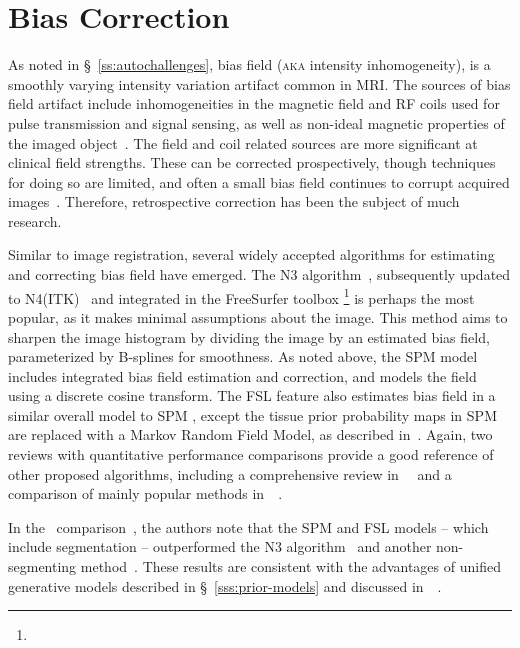 \section{Bias Correction}\label{s:pre-bias}
As noted in \S~\ref{ss:autochallenges}, bias field (\textsc{aka} intensity inhomogeneity),
is a smoothly varying intensity variation artifact common in MRI.
The sources of bias field artifact include
inhomogeneities in the magnetic field and RF coils used for pulse transmission and signal sensing,
as well as non-ideal magnetic properties of the imaged object~\cite{Vovk2007}.
The field and coil related sources are more significant at clinical field strengths.
These can be corrected prospectively, though techniques for doing so are limited,
and often a small bias field continues to corrupt acquired images~\cite{Vovk2007}.
Therefore, retrospective correction has been the subject of much research.
\par
Similar to image registration,
several widely accepted algorithms for estimating and correcting bias field have emerged.
The N3 algorithm~\cite{Sled1998}, subsequently updated to N4(ITK)~\cite{Tustison2010}
and integrated in the FreeSurfer toolbox%
\footnote{}
is perhaps the most popular, as it makes minimal assumptions about the image.
This method aims to sharpen the image histogram by dividing the image by an estimated bias field,
parameterized by B-splines for smoothness.
As noted above, the SPM  model~\cite{Ashburner2005}
includes integrated bias field estimation and correction,
and models the field using a discrete cosine transform.
The FSL  feature also estimates bias field
in a similar overall model to SPM ,
except the tissue prior probability maps in SPM are replaced with a Markov Random Field Model,
as described in~\cite{Zhang2001}.
Again, two reviews with quantitative performance comparisons
provide a good reference of other proposed algorithms,
including a comprehensive review in~\citeyear{Belaroussi2006}~\cite{Belaroussi2006}
and a comparison of mainly popular methods in~\citeyear{Ganzetti2016}~\cite{Ganzetti2016}.
\par
In the~\citeyear{Ganzetti2016} comparison~\cite{Ganzetti2016},
the authors note that the SPM and FSL models -- which include segmentation --
outperformed the N3 algorithm~\cite{Sled1998} and another non-segmenting method~\cite{Dawant1993}.
These results are consistent with
the advantages of unified generative models described in \S~\ref{sss:prior-models}
and discussed in~~\cite{Ashburner2005}.
